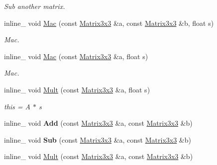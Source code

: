 \begin{DoxyCompactItemize}
\begin{DoxyCompactList}\small\item\em Sub another matrix. \end{DoxyCompactList}\item 
inline\+\_\+ void \hyperlink{classMatrix3x3_a98b8f18c1f5a16242a5149889c5f6202}{Mac} (const \hyperlink{classMatrix3x3}{Matrix3x3} \&a, const \hyperlink{classMatrix3x3}{Matrix3x3} \&b, float s)\hypertarget{classMatrix3x3_a98b8f18c1f5a16242a5149889c5f6202}{}\label{classMatrix3x3_a98b8f18c1f5a16242a5149889c5f6202}

\begin{DoxyCompactList}\small\item\em Mac. \end{DoxyCompactList}\item 
inline\+\_\+ void \hyperlink{classMatrix3x3_a3447245ea3ef24f98a8fe9335d002190}{Mac} (const \hyperlink{classMatrix3x3}{Matrix3x3} \&a, float s)\hypertarget{classMatrix3x3_a3447245ea3ef24f98a8fe9335d002190}{}\label{classMatrix3x3_a3447245ea3ef24f98a8fe9335d002190}

\begin{DoxyCompactList}\small\item\em Mac. \end{DoxyCompactList}\item 
inline\+\_\+ void \hyperlink{classMatrix3x3_aedd287d4f7c2ed61c80ac71460ab3c22}{Mult} (const \hyperlink{classMatrix3x3}{Matrix3x3} \&a, float s)\hypertarget{classMatrix3x3_aedd287d4f7c2ed61c80ac71460ab3c22}{}\label{classMatrix3x3_aedd287d4f7c2ed61c80ac71460ab3c22}

\begin{DoxyCompactList}\small\item\em this = A $\ast$ s \end{DoxyCompactList}\item 
inline\+\_\+ void {\bfseries Add} (const \hyperlink{classMatrix3x3}{Matrix3x3} \&a, const \hyperlink{classMatrix3x3}{Matrix3x3} \&b)\hypertarget{classMatrix3x3_a9dcba2e1c5f0cab8477fc69b53db2155}{}\label{classMatrix3x3_a9dcba2e1c5f0cab8477fc69b53db2155}

\item 
inline\+\_\+ void {\bfseries Sub} (const \hyperlink{classMatrix3x3}{Matrix3x3} \&a, const \hyperlink{classMatrix3x3}{Matrix3x3} \&b)\hypertarget{classMatrix3x3_a3bf4ff7a30a77a02fe8f78076541e3f0}{}\label{classMatrix3x3_a3bf4ff7a30a77a02fe8f78076541e3f0}

\item 
inline\+\_\+ void \hyperlink{classMatrix3x3_ac80995881ea1e23f8eb0f6f57bbb624a}{Mult} (const \hyperlink{classMatrix3x3}{Matrix3x3} \&a, const \hyperlink{classMatrix3x3}{Matrix3x3} \&b)\hypertarget{classMatrix3x3_ac80995881ea1e23f8eb0f6f57bbb624a}{}\label{classMatrix3x3_ac80995881ea1e23f8eb0f6f57bbb624a}


\end{DoxyCompactItemize}
